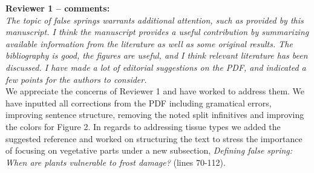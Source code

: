 \documentclass[11pt,a4paper]{article}
\begin{document}


\textbf {Reviewer 1 -- comments:} \\

\textit{The topic of false springs warrants additional attention, such as provided by this manuscript. I think the manuscript provides a useful contribution by summarizing available information from the literature as well as some original results. The bibliography is good, the figures are useful, and I think relevant literature has been discussed. I have made a lot of editorial suggestions on the PDF, and indicated a few points for the authors to consider.}\\


We appreciate the concerns of Reviewer 1 and have worked to address them. We have inputted all corrections from the PDF including gramatical errors, improving sentence structure, removing the noted split infinitives and improving the colors for Figure 2. In regards to addressing tissue types we added the suggested reference and worked on structuring the text to stress the importance of focusing on vegetative parts under a new subsection, \textit{Defining false spring: When are plants vulnerable to frost damage?} (lines 70-112).
\end{document}
